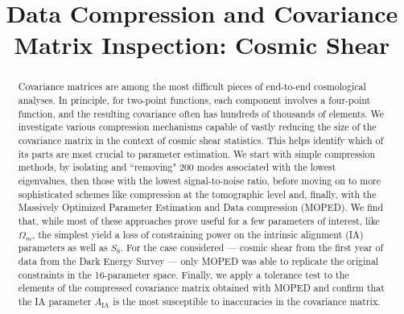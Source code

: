 \documentclass[twocolumn,nofootinbib]{\docclass}
\begin{document}
	
	\title{Data Compression and Covariance Matrix Inspection: Cosmic Shear}
	\maketitlepre
	
	\begin{abstract}
		Covariance matrices are among the most difficult pieces of end-to-end cosmological analyses. In principle, for two-point functions, each component involves a four-point function, and the resulting covariance often has hundreds of thousands of elements. We investigate various compression mechanisms capable of vastly reducing the size of the covariance matrix in the context of cosmic shear statistics. 
		This helps identify which of its parts are most crucial to parameter estimation. We start with simple compression methods, by isolating and ``removing" 200 modes associated with the lowest eigenvalues, then those with the lowest signal-to-noise ratio, before moving on to more sophisticated schemes like compression at the tomographic level and, finally, with the Massively Optimized Parameter Estimation and Data compression (MOPED). We find that, while most of these approaches prove useful for a few parameters of interest, like $\Omega_m$, the simplest yield a loss of constraining power on the intrinsic alignment (IA) parameters as well as $S_8$. For the case considered --- cosmic shear from the first year of data from the Dark Energy Survey --- only MOPED was able to replicate the original constraints in the 16-parameter space. Finally, we apply a tolerance test to the elements of the compressed covariance matrix obtained with MOPED and confirm that the IA parameter $A_{\mathrm{IA}}$ is the most susceptible to inaccuracies in the covariance matrix.
		

\end{abstract}
\end{document}
